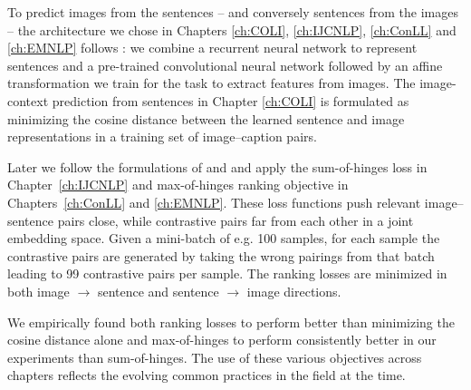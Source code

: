 To predict images from the sentences -- and conversely sentences from the images --
the architecture we chose in
Chapters \ref{ch:COLI}, \ref{ch:IJCNLP}, \ref{ch:ConLL} and \ref{ch:EMNLP} follows \cite{kiros2014unifying}: 
we combine a recurrent neural network to represent sentences and a pre-trained convolutional neural network
followed by an affine transformation we train for the task
to extract features from images.
The image-context prediction from sentences in
Chapter \ref{ch:COLI} is formulated  as minimizing the cosine distance
between the learned sentence  and image representations
in a training set of image--caption pairs.


Later we follow the formulations of \cite{vendrov2016order} and \cite{faghri2017vse++} and apply
the sum-of-hinges loss in Chapter~\ref{ch:IJCNLP} and max-of-hinges ranking objective
in Chapters~\ref{ch:ConLL} and \ref{ch:EMNLP}. These loss functions
push relevant image--sentence pairs close, while contrastive pairs 
far from each other in a joint embedding space. Given a mini-batch of e.g. 100 samples, for each sample
the contrastive pairs are generated by taking the wrong pairings from that batch leading to
99 contrastive pairs per sample. The ranking losses are minimized in both image $\rightarrow$ sentence
and sentence $\rightarrow$ image directions.

We empirically found both ranking losses to perform better than minimizing the cosine distance alone 
and max-of-hinges to perform consistently better in our experiments than sum-of-hinges. 
The use of these various objectives across
chapters  reflects the evolving common practices in the field at the time.



